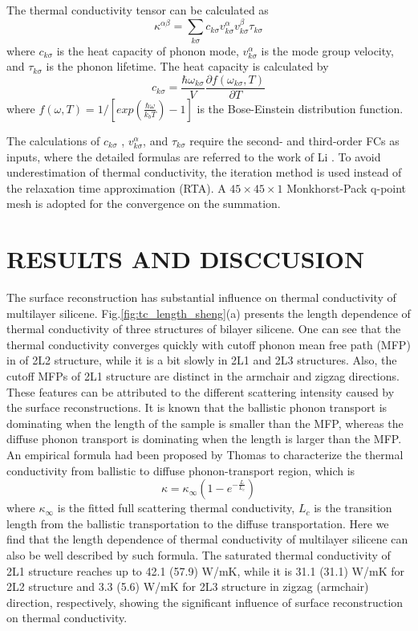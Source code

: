 \documentclass[review]{elsarticle}
\begin{document}
The thermal conductivity tensor can be calculated as
\begin{equation}
  \kappa^{\alpha\beta} = \sum_{k \sigma}{c_{k \sigma}v^{\alpha}_{k \sigma}v^{\beta}_{k \sigma}\tau_{k \sigma}} \label{eq:kappasum}
\end{equation}
where $c_{k \sigma}$ is the heat capacity of phonon mode,  $v_{k \sigma}^{\alpha}$ is the mode group velocity, and $\tau_{k \sigma}$ is the phonon lifetime. The heat capacity is calculated by
\begin{equation}
  c_{k \sigma}=\frac{\hbar \omega_{k \sigma} }{V} \frac{\partial f(\omega_{k \sigma},T)}{\partial T} \label{eq:cv}
\end{equation}
where $ f(\omega,T)=1/[exp(\frac{\hbar \omega}{k_b T})-1]$ is the Bose-Einstein distribution function.

The calculations of $c_{k\sigma}$ , $v_{k \sigma}^{\alpha}$, and $\tau_{k\sigma}$ require the second- and third-order FCs as inputs, where the detailed formulas are referred to the work of  Li \cite{Li2014}. To avoid underestimation of thermal conductivity, the iteration method is used instead of the relaxation time approximation (RTA). A $45\times 45 \times 1$ Monkhorst-Pack q-point mesh is adopted for the convergence on the summation.

\section{RESULTS AND DISCCUSION}

The surface reconstruction has substantial influence on thermal conductivity of multilayer silicene.
Fig.\ref{fig:tc_length_sheng}(a) presents the length dependence of thermal conductivity of three structures of bilayer silicene.
One can see that the thermal conductivity converges quickly with cutoff phonon mean free path (MFP) in of 2L2 structure, while it is a bit slowly in 2L1 and 2L3 structures. Also, the cutoff MFPs of 2L1 structure are distinct in the armchair and zigzag directions. These features can be attributed to the different scattering intensity caused by the surface reconstructions.
It is known that the ballistic phonon transport is dominating when the length of the sample is smaller than the MFP,  whereas the diffuse phonon transport is  dominating when the length is larger than the MFP.
An empirical formula had been proposed by Thomas\cite{Thomas2010}  to characterize the thermal conductivity from ballistic to diffuse phonon-transport region, which is
\begin{equation}
  \kappa = \kappa_\infty (1-e^{-\frac{L}{L_c}}) \label{eq:eq_nemd}
\end{equation}
where $\kappa_\infty$ is the fitted full scattering thermal conductivity, $L_c$ is the transition length from the ballistic transportation to the diffuse transportation. Here we find that the length dependence of thermal conductivity of multilayer silicene can also be well described by such formula.
The saturated thermal conductivity of 2L1 structure reaches up to 42.1 (57.9) W/mK, while it is  31.1 (31.1) W/mK  for 2L2 structure and  3.3 (5.6)  W/mK for 2L3 structure in zigzag (armchair) direction, respectively,  showing the significant influence of surface reconstruction on thermal conductivity.
\end{document}
